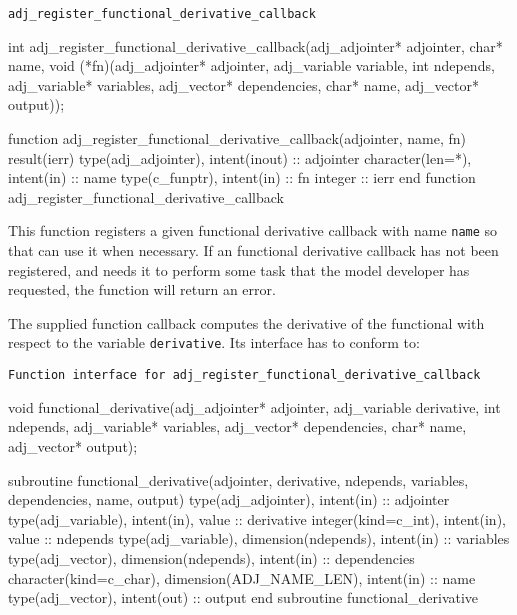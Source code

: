 \begin{boxwithtitle}{\texttt{adj_register_functional_derivative_callback}}
\begin{minipage}{\columnwidth}
\begin{ccode}
  int adj_register_functional_derivative_callback(adj_adjointer* adjointer, 
                      char* name, 
                      void (*fn)(adj_adjointer* adjointer, 
                                 adj_variable variable, int ndepends, 
                                 adj_variable* variables, adj_vector* dependencies, 
                                 char* name, adj_vector* output));
\end{ccode}
\begin{fortrancode}
  function adj_register_functional_derivative_callback(adjointer, name, fn) 
      result(ierr)
    type(adj_adjointer), intent(inout) :: adjointer
    character(len=*), intent(in) :: name
    type(c_funptr), intent(in) :: fn
    integer :: ierr
  end function adj_register_functional_derivative_callback
\end{fortrancode}
\end{minipage}
\end{boxwithtitle}
This function registers a given functional derivative callback with name \texttt{name} so that \libadjoint can use
it when necessary. 
If an functional derivative callback has not been registered, and \libadjoint needs it to perform some task that the model developer has
requested, the function will return an  error.

The supplied function callback computes the derivative of the functional with respect to the variable \texttt{derivative}. 
Its interface has to conform to:

\begin{boxwithtitle}{\texttt{Function interface for \texttt{adj_register_functional_derivative_callback}}}
\begin{minipage}{\columnwidth}
\begin{ccode}
  void functional_derivative(adj_adjointer* adjointer,
                                 adj_variable derivative, int ndepends, 
                                 adj_variable* variables, adj_vector* dependencies,
                                 char* name, adj_vector* output);
\end{ccode}
\begin{fortrancode}
  subroutine functional_derivative(adjointer, derivative, ndepends, variables, 
                                   dependencies, name, output) 
    type(adj_adjointer), intent(in) :: adjointer
    type(adj_variable), intent(in), value :: derivative 
    integer(kind=c_int), intent(in), value :: ndepends
    type(adj_variable), dimension(ndepends), intent(in) :: variables
    type(adj_vector), dimension(ndepends), intent(in) :: dependencies
    character(kind=c_char), dimension(ADJ_NAME_LEN), intent(in) :: name
    type(adj_vector), intent(out) :: output
  end subroutine functional_derivative
\end{fortrancode}
\end{minipage}
\end{boxwithtitle}

